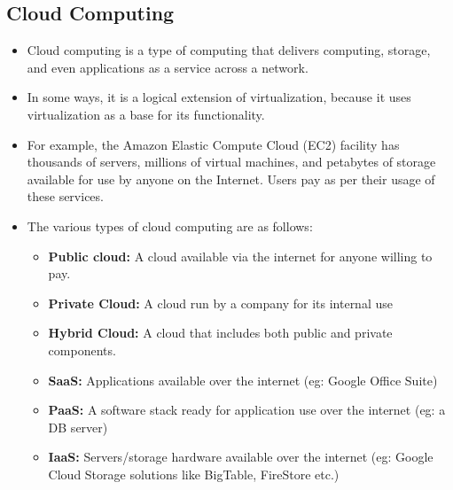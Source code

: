 \documentclass{article}
\theoremstyle{plain}
\theoremstyle{definition}
\begin{document}
\subsection{Cloud Computing}
\begin{itemize}
    \item Cloud computing is a type of computing that delivers computing, storage, and even applications as a service across a network. 
    
    \item In some ways, it is a logical extension of virtualization, because it uses virtualization as a base for its functionality. 
    
    \item For example, the Amazon Elastic Compute Cloud (EC2) facility has thousands of servers, millions of virtual machines, and petabytes of storage available for use by anyone on the Internet. Users pay as per their usage of these services.
    
    \item The various types of cloud computing are as follows:
    \begin{itemize}
        \item \textbf{Public cloud:} A cloud available via the internet for anyone willing to pay.
        
        \item \textbf{Private Cloud:} A cloud run by a company for its internal use
        
        \item \textbf{Hybrid Cloud:} A cloud that includes both public and private components.
        
        \item \textbf{SaaS:} Applications available over the internet (eg: Google Office Suite)
        
        \item \textbf{PaaS:} A software stack ready for application use over the internet (eg: a DB server)
        
        \item \textbf{IaaS:} Servers/storage hardware available over the internet (eg: Google Cloud Storage solutions like BigTable, FireStore etc.)
    \end{itemize}
    

\end{itemize}
\end{document}
